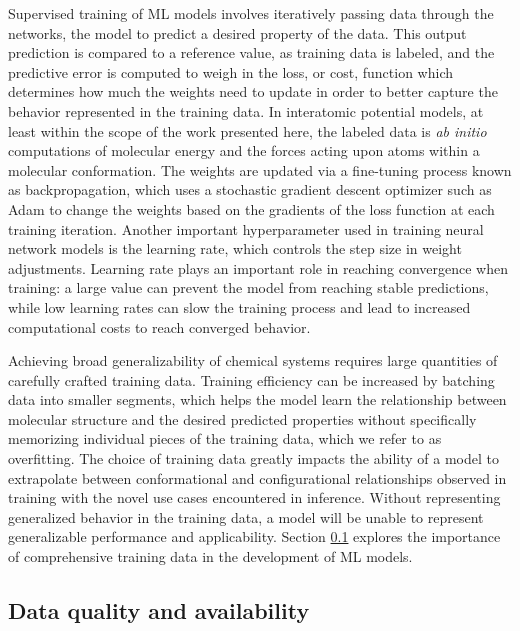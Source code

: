 Supervised training of ML models involves iteratively passing data through the networks,  the model to predict a desired property of the data.
This output prediction is compared to a reference value, as training data is labeled, and the predictive error is computed to weigh in the loss, or cost, function which determines how much the weights need to update in order to better capture the behavior represented in the training data. 
In interatomic potential models, at least within the scope of the work presented here, the labeled data is \textit{ab initio} computations of molecular energy and the forces acting upon atoms within a molecular conformation.
The weights are updated via a fine-tuning process known as backpropagation, which uses a stochastic gradient descent optimizer such as Adam \cite{adam_optim} to change the weights based on the gradients of the loss function at each training iteration. 
Another important hyperparameter used in training neural network models is the learning rate, which controls the step size in weight adjustments.
Learning rate plays an important role in reaching convergence when training: a large value can prevent the model from reaching stable predictions, while low learning rates can slow the training process and lead to increased computational costs to reach converged behavior.

Achieving broad generalizability of chemical systems requires large quantities of carefully crafted training data.
Training efficiency can be increased by batching data into smaller segments, which helps the model learn the relationship between molecular structure and the desired predicted properties without specifically memorizing individual pieces of the training data, which we refer to as overfitting.
The choice of training data greatly impacts the ability of a model to extrapolate between conformational and configurational relationships observed in training with the novel use cases encountered in inference. 
Without representing generalized behavior in the training data, a model will be unable to represent generalizable performance and applicability.
Section \ref{subsec:Data quality and availability} explores the importance of comprehensive training data in the development of ML models.

\subsection{Data quality and availability}
\label{subsec:Data quality and availability}

